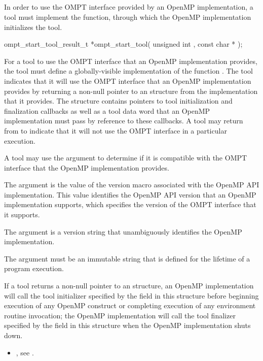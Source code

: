 \subsection{}
\label{sec:ompt_start_tool}

\summary
In order to use the OMPT interface provided by an OpenMP implementation,
a tool must implement the  function, through which 
the OpenMP implementation initializes the tool.

\format
\begin{cspecific}
\begin{omptOther}
ompt_start_tool_result_t *ompt_start_tool(
  unsigned int ,
  const char *
);
\end{omptOther}
\end{cspecific}

\descr
For a tool to use the OMPT interface that an OpenMP implementation provides,
the tool must define a globally-visible implementation of the
function . The tool indicates that it will use the OMPT 
interface that an OpenMP implementation provides by returning a non-null 
pointer to an  structure from the 
 implementation that it provides. The 
 structure contains pointers to tool 
initialization and finalization callbacks as well as a tool data word 
that an OpenMP implementation must pass by reference to these callbacks. 
A tool may return  from  to indicate 
that it will not use the OMPT interface in a particular execution.

A tool may use the  argument to determine if it is 
compatible with the OMPT interface that the OpenMP implementation provides.

\argdesc
The argument  is the value of the  version macro
associated with the OpenMP API implementation. This value identifies the OpenMP 
API version that an OpenMP implementation supports, which specifies the version 
of the OMPT interface that it supports.

The argument  is a version string that unambiguously 
identifies the OpenMP implementation.

\constraints
The argument  must be an immutable string that is defined 
for the lifetime of a program execution.

\effect
If a tool returns a non-null pointer to an  
structure, an OpenMP implementation will call the tool initializer specified 
by the  field in this structure before beginning execution 
of any OpenMP construct or completing execution of any environment routine 
invocation; the OpenMP implementation will call the tool finalizer specified 
by the  field in this structure when the OpenMP implementation 
shuts down.

\crossreferences
\begin{itemize}
\item {}, see
.
\end{itemize}

